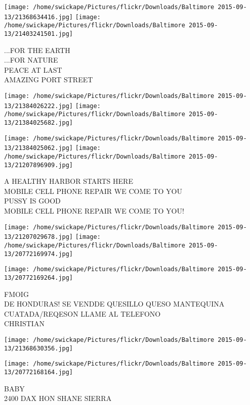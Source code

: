 \documentclass[10pt,letterpaper]{article}
\begin{document}
\texttt{[image: /home/swickape/Pictures/flickr/Downloads/Baltimore 2015-09-13/21368634416.jpg]}
\texttt{[image: /home/swickape/Pictures/flickr/Downloads/Baltimore 2015-09-13/21403241501.jpg]}

...FOR THE EARTH\\
...FOR NATURE\\
PEACE AT LAST\\
AMAZING PORT STREET\\
\pagebreak

\texttt{[image: /home/swickape/Pictures/flickr/Downloads/Baltimore 2015-09-13/21384026222.jpg]}
\texttt{[image: /home/swickape/Pictures/flickr/Downloads/Baltimore 2015-09-13/21384025682.jpg]}

\texttt{[image: /home/swickape/Pictures/flickr/Downloads/Baltimore 2015-09-13/21384025062.jpg]}
\texttt{[image: /home/swickape/Pictures/flickr/Downloads/Baltimore 2015-09-13/21207896909.jpg]}

A HEALTHY HARBOR STARTS HERE\\
MOBILE CELL PHONE REPAIR WE COME TO YOU\\
PUSSY IS GOOD\\
MOBILE CELL PHONE REPAIR WE COME TO YOU!\\
\pagebreak

\texttt{[image: /home/swickape/Pictures/flickr/Downloads/Baltimore 2015-09-13/21207029678.jpg]}
\texttt{[image: /home/swickape/Pictures/flickr/Downloads/Baltimore 2015-09-13/20772169974.jpg]}

\vspace{0.25in}
\texttt{[image: /home/swickape/Pictures/flickr/Downloads/Baltimore 2015-09-13/20772169264.jpg]}

FMOIG\\
DE HONDURAS!  SE VENDDE QUESILLO QUESO MANTEQUINA CUATADA/REQESON LLAME AL TELEFONO\\
CHRISTIAN\\
\pagebreak

\texttt{[image: /home/swickape/Pictures/flickr/Downloads/Baltimore 2015-09-13/21368630356.jpg]}

\vspace{0.25in}
\texttt{[image: /home/swickape/Pictures/flickr/Downloads/Baltimore 2015-09-13/20772168164.jpg]}

BABY\\
2400 DAX HON SHANE SIERRA\\
\pagebreak
\end{document}

